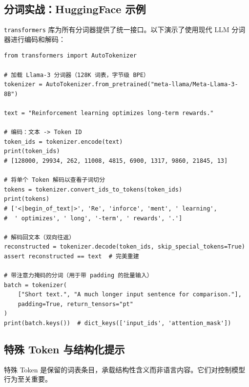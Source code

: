\subsection{分词实战：HuggingFace 示例}
\label{tokenization-in-practice-huggingface-example}

\texttt{transformers} 库为所有分词器提供了统一接口。以下演示了使用现代 LLM 分词器进行编码和解码：

\begin{lstlisting}[style=pythonstyle, caption={使用 HuggingFace Transformers 进行分词的编码/解码。}]
from transformers import AutoTokenizer

# 加载 Llama-3 分词器（128K 词表，字节级 BPE）
tokenizer = AutoTokenizer.from_pretrained("meta-llama/Meta-Llama-3-8B")

text = "Reinforcement learning optimizes long-term rewards."

# 编码：文本 -> Token ID
token_ids = tokenizer.encode(text)
print(token_ids)
# [128000, 29934, 262, 11008, 4815, 6900, 1317, 9860, 21845, 13]

# 将单个 Token 解码以查看子词切分
tokens = tokenizer.convert_ids_to_tokens(token_ids)
print(tokens)
# ['<|begin_of_text|>', 'Re', 'inforce', 'ment', ' learning',
#  ' optimizes', ' long', '-term', ' rewards', '.']

# 解码回文本（双向往返）
reconstructed = tokenizer.decode(token_ids, skip_special_tokens=True)
assert reconstructed == text  # 完美重建

# 带注意力掩码的分词（用于带 padding 的批量输入）
batch = tokenizer(
    ["Short text.", "A much longer input sentence for comparison."],
    padding=True, return_tensors="pt"
)
print(batch.keys())  # dict_keys(['input_ids', 'attention_mask'])
\end{lstlisting}

\subsection{特殊 Token 与结构化提示}
\label{special-tokens-and-structured-prompts}

特殊 Token 是保留的词表条目，承载结构性含义而非语言内容。它们对控制模型行为至关重要。

